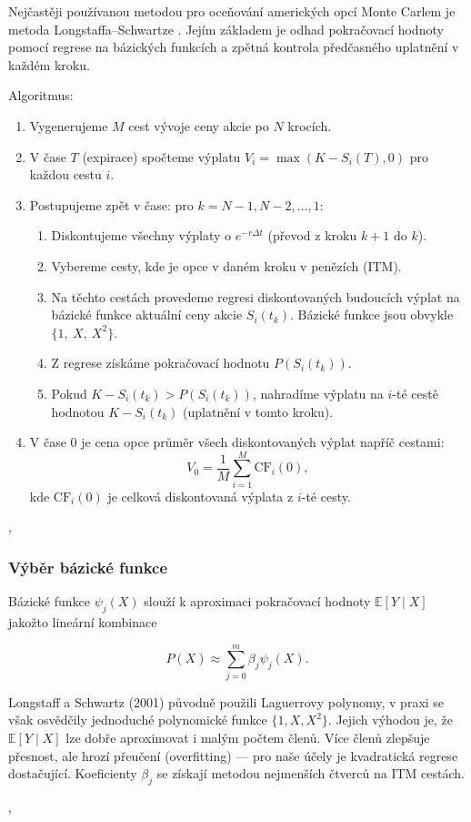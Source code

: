 \documentclass{article}
\begin{document}
Nejčastěji používanou metodou pro oceňování amerických opcí Monte Carlem je metoda Longstaffa–Schwartze \citep{LongstaffSchwartz2001}. Jejím základem je odhad pokračovací hodnoty pomocí regrese na bázických funkcích a zpětná kontrola předčasného uplatnění v každém kroku.

Algoritmus:

\begin{enumerate}
  \item Vygenerujeme $M$ cest vývoje ceny akcie po $N$ krocích.
  \item V čase $T$ (expirace) spočteme výplatu $V_i = \max(K - S_i(T), 0)$ pro každou cestu $i$.
  \item Postupujeme zpět v čase: pro $k = N-1, N-2, \dots, 1$:
    \begin{enumerate}
      \item Diskontujeme všechny výplaty o $e^{-r\Delta t}$ (převod z kroku $k+1$ do $k$).
      \item Vybereme cesty, kde je opce v daném kroku v penězích (ITM).
      \item Na těchto cestách provedeme regresi diskontovaných budoucích výplat na bázické funkce aktuální ceny akcie $S_i(t_k)$. Bázické funkce jsou obvykle $\{1,\ X,\ X^2\}$.
      \item Z regrese získáme pokračovací hodnotu $P(S_i(t_k))$.
      \item Pokud $K - S_i(t_k) > P(S_i(t_k))$, nahradíme výplatu na $i$-té cestě hodnotou $K - S_i(t_k)$ (uplatnění v tomto kroku).
    \end{enumerate}
  \item V čase $0$ je cena opce průměr všech diskontovaných výplat napříč cestami:
    \[
    V_0 = \frac{1}{M} \sum_{i=1}^M \text{CF}_i(0),
    \]
    kde $\text{CF}_i(0)$ je celková diskontovaná výplata z $i$-té cesty.
\end{enumerate}

\citep{LongstaffSchwartz2001}, \citep[Kapitola~80.16]{Wilmott2006}

\subsubsection{Výběr bázické funkce}

Bázické funkce \(\psi_j(X)\) slouží k aproximaci pokračovací hodnoty \(\mathbb{E}[Y \mid X]\) jakožto lineární kombinace

\[
P(X) \approx \sum_{j=0}^m \beta_j \psi_j(X).
\]

Longstaff a Schwartz (2001) původně použili Laguerrovy polynomy, v praxi se však osvědčily jednoduché polynomické funkce \(\{1, X, X^2\}\). Jejich výhodou je, že \(\mathbb{E}[Y \mid X]\) lze dobře aproximovat i malým počtem členů. Více členů zlepšuje přesnost, ale hrozí přeučení (overfitting) — pro naše účely je kvadratická regrese dostačující. Koeficienty \(\beta_j\) se získají metodou nejmenších čtverců na ITM cestách.

\citep{LongstaffSchwartz2001}, \citep[Kapitola~8.4]{Glasserman2004}
\end{document}
